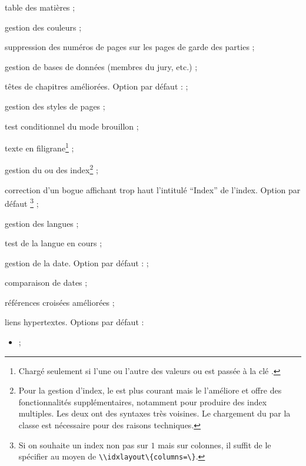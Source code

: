 \begin{description}
  table des matières ;
\item[\package*{xcolor} :] gestion des couleurs ;
\item[\package{nonumonpart} :] suppression des numéros de pages sur
  les pages de garde des parties ;
\item[\package{datatool} :] gestion de bases de données (membres du
  jury, etc.) ;
\item[\package{fncychap} :] têtes de chapitres améliorées. Option par défaut :
   ;
\item[\package{titleps} :] gestion des styles de pages ;
\item[\package{ifdraft} :] test conditionnel du mode brouillon ;
\item[\package{draftwatermark} :] texte en filigrane\footnote{Chargé seulement
    si l'une ou l'autre des valeurs  ou 
    est passée à la clé .} ;
\item[\package*{index} :] gestion du ou des index\footnote{Pour la gestion
    d'index, le  est plus courant mais le 
    l'améliore et offre des fonctionnalités supplémentaires, notamment pour
    produire des index multiples. Les deux ont des syntaxes très voisines. Le
    chargement du  par la classe est nécessaire pour des raisons
    techniques.} ;
\item[\package*{idxlayout} :] correction d'un bogue affichant trop haut
  l'intitulé \enquote{Index} de l'index. Option par défaut
  \footnote{Si on souhaite un index non pas sur $1$ mais
    sur  colonnes, il suffit de le spécifier au moyen de
    \protect\lstinline+\\idxlayout\{columns=+\protect\lstinline+\}+.} ;
\item[\package*{babel} :] gestion des langues ;
\item[\package{iflang} :] test de la langue en cours ;
\item[\package{datetime} :] gestion de la date. Option par défaut :
   ;
\item[\package{datenumber} :] comparaison de dates ;
\item[\package*{varioref} :] références croisées améliorées ;
\item[\package*{hyperref} :] liens hypertextes. Options par défaut :
  \begin{itemize}
  \item {} ;

\end{itemize}
\end{description}
